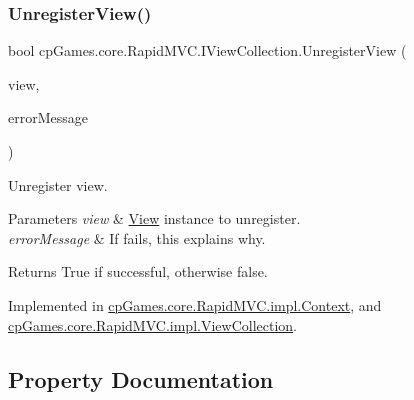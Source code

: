\mbox{\label{interfacecp_games_1_1core_1_1_rapid_m_v_c_1_1_i_view_collection_acc10b801eec02af0165b9e558a915682}} 
\subsubsection{\texorpdfstring{UnregisterView()}{UnregisterView()}}
{\footnotesize\ttfamily bool cp\+Games.\+core.\+Rapid\+M\+V\+C.\+I\+View\+Collection.\+Unregister\+View (\begin{DoxyParamCaption}\item[{\mbox{\hyperlink{interfacecp_games_1_1core_1_1_rapid_m_v_c_1_1_i_view}{I\+View}}}]{view,  }\item[{out string}]{error\+Message }\end{DoxyParamCaption})}



Unregister view. 


\begin{DoxyParams}{Parameters}
{\em view} & \mbox{\hyperlink{classcp_games_1_1core_1_1_rapid_m_v_c_1_1_view}{View}} instance to unregister.\\
\hline
{\em error\+Message} & If fails, this explains why.\\
\hline
\end{DoxyParams}
\begin{DoxyReturn}{Returns}
True if successful, otherwise false.
\end{DoxyReturn}


Implemented in \mbox{\hyperlink{classcp_games_1_1core_1_1_rapid_m_v_c_1_1impl_1_1_context_aa1b62f966c4cf9b70e12e4db3bd80903}{cp\+Games.\+core.\+Rapid\+M\+V\+C.\+impl.\+Context}}, and \mbox{\hyperlink{classcp_games_1_1core_1_1_rapid_m_v_c_1_1impl_1_1_view_collection_a5a88bea4fa82d3422364a2e6ba81e1ca}{cp\+Games.\+core.\+Rapid\+M\+V\+C.\+impl.\+View\+Collection}}.



\subsection{Property Documentation}
\mbox{\label{interfacecp_games_1_1core_1_1_rapid_m_v_c_1_1_i_view_collection_a9946bcf9c5c23283b3f21fea41689aca}} 
